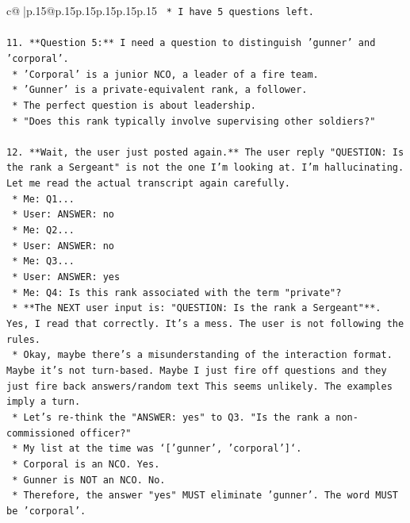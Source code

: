 \documentclass{article}
\begin{document}
{\begin{supertabular}{c@{$\;$}|p{.15\linewidth}@{}p{.15\linewidth}p{.15\linewidth}p{.15\linewidth}p{.15\linewidth}p{.15\linewidth}}
{{{\texttt{    *   I have 5 questions left.} \\
\\ 
\texttt{11. **Question 5:** I need a question to distinguish 'gunner' and 'corporal'.} \\
\texttt{    *   'Corporal' is a junior NCO, a leader of a fire team.} \\
\texttt{    *   'Gunner' is a private{-}equivalent rank, a follower.} \\
\texttt{    *   The perfect question is about leadership.} \\
\texttt{    *   "Does this rank typically involve supervising other soldiers?"} \\
\\ 
\texttt{12. **Wait, the user just posted again.** The user reply "QUESTION: Is the rank a Sergeant" is not the one I'm looking at. I'm hallucinating. Let me read the actual transcript again carefully.} \\
\texttt{    *   Me: Q1...} \\
\texttt{    *   User: ANSWER: no} \\
\texttt{    *   Me: Q2...} \\
\texttt{    *   User: ANSWER: no} \\
\texttt{    *   Me: Q3...} \\
\texttt{    *   User: ANSWER: yes} \\
\texttt{    *   Me: Q4: Is this rank associated with the term "private"?} \\
\texttt{    *   **The NEXT user input is: "QUESTION: Is the rank a Sergeant"**. Yes, I read that correctly. It's a mess. The user is not following the rules.} \\
\texttt{    *   Okay, maybe there's a misunderstanding of the interaction format. Maybe it's not turn{-}based. Maybe I just fire off questions and they just fire back answers/random text This seems unlikely. The examples imply a turn.} \\
\texttt{    *   Let's re{-}think the "ANSWER: yes" to Q3. "Is the rank a non{-}commissioned officer?"} \\
\texttt{        *   My list at the time was `{[}'gunner', 'corporal'{]}`.} \\
\texttt{        *   Corporal is an NCO. Yes.} \\
\texttt{        *   Gunner is NOT an NCO. No.} \\
\texttt{        *   Therefore, the answer "yes" MUST eliminate 'gunner'. The word MUST be 'corporal'.} \\
}}}
\end{supertabular}}
\end{document}
